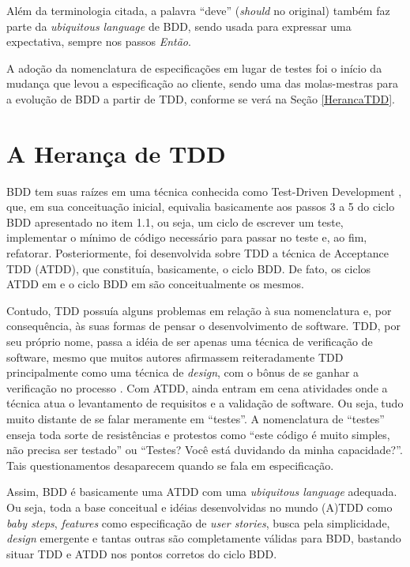 \documentclass[a4paper,abntfigtabnum,noindentfirst]{abnt}
\begin{document}
Além da terminologia citada, a palavra ``deve'' (\textit{should} no original) também faz parte da \textit{ubiquitous language} de BDD, sendo usada para expressar uma expectativa, sempre nos passos \textit{Então}.

A adoção da nomenclatura de especificações em lugar de testes foi o início da mudança que levou a especificação ao cliente, sendo uma das molas-mestras para a evolução de BDD a partir de TDD, conforme se verá na Seção \ref{HerancaTDD}.

\section*{A Herança de TDD}
\label{HerancaTDD}

BDD tem suas raízes em uma técnica conhecida como Test-Driven Development \cite{TDDByExample}, que, em sua conceituação inicial, equivalia basicamente aos passos 3 a 5 do ciclo BDD apresentado no item 1.1, ou seja, um ciclo de escrever um teste, implementar o mínimo de código necessário para passar no teste e, ao fim, refatorar. Posteriormente, foi desenvolvida sobre TDD a técnica de Acceptance TDD (ATDD), que constituía, basicamente, o ciclo BDD. De fato, os ciclos ATDD em  e o ciclo BDD em  são conceitualmente os mesmos.

Contudo, TDD possuía alguns problemas em relação à sua nomenclatura e, por consequência, às suas formas de pensar o desenvolvimento de software. TDD, por seu próprio nome, passa a idéia de ser apenas uma técnica de verificação de software, mesmo que muitos autores afirmassem reiteradamente TDD principalmente como uma técnica de \textit{design}, com o bônus de se ganhar a verificação no processo \cite{DrivingSoftwareQualityCrispin} \cite{TDDAstels} \cite{TDDDesignJanzen}. Com ATDD, ainda entram em cena atividades onde a técnica atua o levantamento de requisitos e a validação de software. Ou seja, tudo muito distante de se falar meramente em ``testes''. A nomenclatura de ``testes'' enseja toda sorte de resistências e protestos como ``este código é muito simples, não precisa ser testado'' ou ``Testes? Você está duvidando da minha capacidade?''. Tais questionamentos desaparecem quando se fala em especificação.

Assim, BDD é basicamente uma ATDD com uma \textit{ubiquitous language} adequada. Ou seja, toda a base conceitual e idéias desenvolvidas no mundo (A)TDD como \textit{baby steps}, \textit{features} como especificação de \textit{user stories}, busca pela simplicidade, \textit{design} emergente e tantas outras são completamente válidas para BDD, bastando situar TDD e ATDD nos pontos corretos do ciclo BDD.
\end{document}
